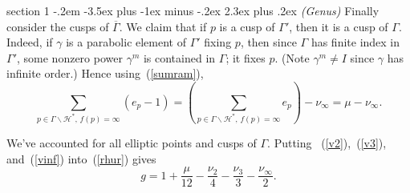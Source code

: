 \documentclass[12pt]{article}
\makeatletter
\theoremstyle{norm}
\providecommand{\cal}[1]{\mathcal{#1}}
\renewcommand{\cal}[1]{\mathcal{#1}}
\newcommand{\ga}[0]{\gamma}
\newcommand{\Ga}[0]{\Gamma}
\newcommand{\pa}[1]{\left( {#1} \right)}
\newcommand{\bs}[0]{\backslash}
\newenvironment{problem}{\@startsection
       {section}
       {1}
       {-.2em}
       {-3.5ex plus -1ex minus -.2ex}
       {2.3ex plus .2ex}
       {\pagebreak[3]%
       \large\bf\noindent{Problem }
       }
       }
       {%
       }
\makeatother
\begin{document}
\begin{problem}{\it (Genus)}
Finally consider the cusps of $\overline{\Ga}$. We claim that if $p$ is a cusp of $\Ga'$, then it is a cusp of $\Ga$. Indeed, if $\ga$ is a parabolic element of $\Ga'$ fixing $p$, then since $\Ga$ has finite index in $\Ga'$, some nonzero power $\ga^m$ is contained in $\Ga$; it fixes $p$. (Note $\ga^m\neq I$ since $\ga$ has infinite order.) Hence using~(\ref{sumram}),
\begin{equation}\label{vinf}
\sum_{p\in \Ga\bs \cal H^*,\, f(p)=\infty}(e_p-1)=\pa{\sum_{p\in \Ga\bs \cal H^*,\, f(p)=\infty}e_p}-\nu_{\infty}=\mu-\nu_{\infty}.
\end{equation}

We've accounted for all elliptic points and cusps of $\Ga$. Putting ~(\ref{v2}),~(\ref{v3}), and~(\ref{vinf}) into~(\ref{rhur}) gives
\begin{equation}\label{genus}
g=1+\frac{\mu}{12}-\frac{\nu_2}{4}-\frac{\nu_3}{3}-\frac{\nu_{\infty}}{2}.
\end{equation}


\end{problem}
\end{document}
